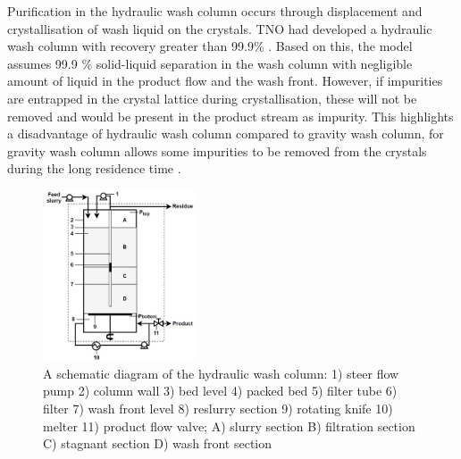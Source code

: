 Purification in the hydraulic wash column occurs through displacement and crystallisation of wash liquid on the crystals. TNO had developed a hydraulic wash column with recovery greater than 99.9\% \cite{noauthor_melt_nodate}. Based on this, the model assumes 99.9 \% solid-liquid separation in the wash column with negligible amount of liquid in the product flow and the wash front. However, if impurities are entrapped in the crystal lattice during crystallisation, these will not be removed and would be present in the product stream as impurity. This highlights a disadvantage of hydraulic wash column compared to gravity wash column, for gravity wash column allows some impurities to be removed from the crystals during the long residence time \cite{van_oord-knol_hydraulic_2000}.

\begin{figure}
\centering
\includegraphics[width=0.4\textwidth]{chapters/3-separation/figures/hydraulic.jpg}
\caption{A schematic diagram of the hydraulic wash column: 1) steer flow pump 2) column wall 3) bed level 4) packed bed 5) filter tube 6) filter 7) wash front level 8) reslurry section 9) rotating knife 10) melter 11) product flow valve; A) slurry section B) filtration section C) stagnant section D) wash front section \cite{van_oord-knol_hydraulic_2000}}
\label{fig:hydraulic}
\end{figure}


